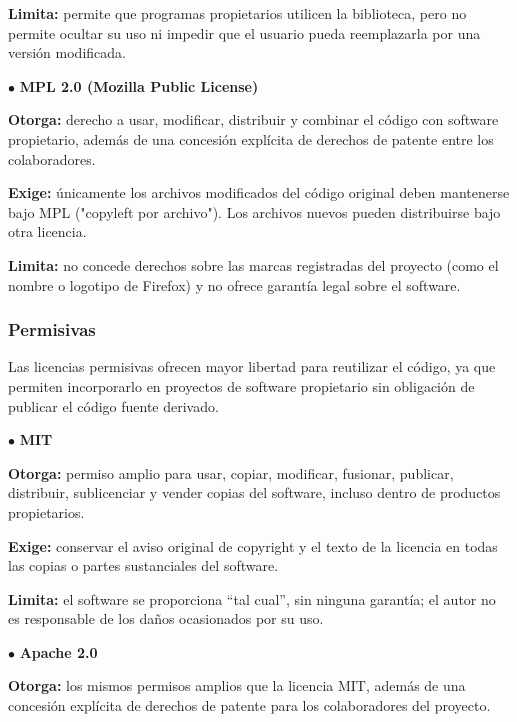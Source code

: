 \documentclass[12pt]{article}
\begin{document}
    \textbf{Limita:} permite que programas propietarios utilicen la biblioteca, pero no permite ocultar su uso ni impedir que el usuario pueda reemplazarla por una versión modificada.

    \medskip

    \hspace*{\parindent}$\bullet$ \textbf{MPL 2.0 (Mozilla Public License)}

    \textbf{Otorga:} derecho a usar, modificar, distribuir y combinar el código con software propietario, además de una concesión explícita de derechos de patente entre los colaboradores.

    \textbf{Exige:} únicamente los archivos modificados del código original deben mantenerse bajo MPL ("copyleft por archivo"). Los archivos nuevos pueden distribuirse bajo otra licencia.

    \textbf{Limita:} no concede derechos sobre las marcas registradas del proyecto (como el nombre o logotipo de Firefox) y no ofrece garantía legal sobre el software.

    \subsubsection{Permisivas}

    Las licencias permisivas ofrecen mayor libertad para reutilizar el código, ya que permiten incorporarlo en proyectos de software propietario sin obligación de publicar el código fuente derivado.

    \smallskip

    \hspace*{\parindent}$\bullet$ \textbf{MIT}

    \textbf{Otorga:} permiso amplio para usar, copiar, modificar, fusionar, publicar, distribuir, sublicenciar y vender copias del software, incluso dentro de productos propietarios.

    \textbf{Exige:} conservar el aviso original de copyright y el texto de la licencia en todas las copias o partes sustanciales del software.

    \textbf{Limita:} el software se proporciona ``tal cual'', sin ninguna garantía; el autor no es responsable de los daños ocasionados por su uso.

    \medskip

    \hspace*{\parindent}$\bullet$ \textbf{Apache 2.0}

    \textbf{Otorga:} los mismos permisos amplios que la licencia MIT, además de una concesión explícita de derechos de patente para los colaboradores del proyecto.
\end{document}
